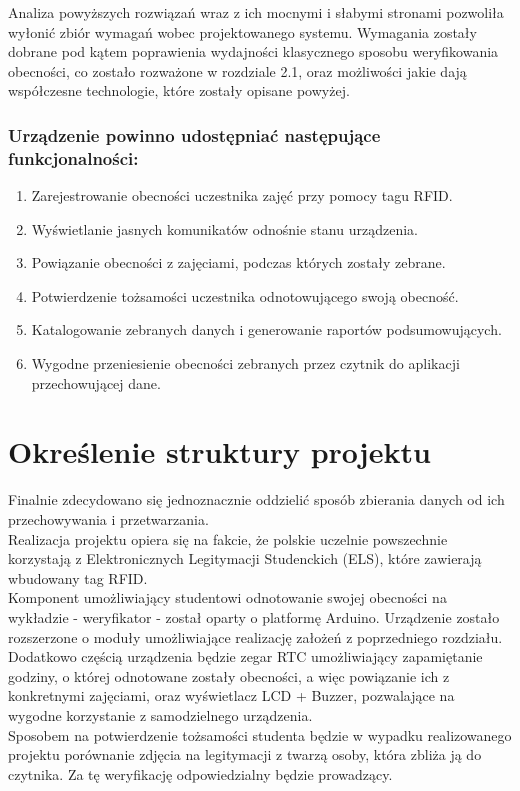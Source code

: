 \documentclass[declaration,shortabstract, mgr]{iithesis}
\begin{document}
\indent Analiza powyższych rozwiązań wraz z ich mocnymi i słabymi stronami pozwoliła wyłonić zbiór wymagań wobec projektowanego systemu. Wymagania zostały dobrane pod kątem poprawienia wydajności klasycznego sposobu weryfikowania obecności, co zostało rozważone w rozdziale 2.1, oraz możliwości jakie dają współczesne technologie, które zostały opisane powyżej.

\subsubsection{Urządzenie powinno udostępniać następujące funkcjonalności:}

\begin{enumerate}
\item Zarejestrowanie obecności uczestnika zajęć przy pomocy tagu RFID.
\item Wyświetlanie jasnych komunikatów odnośnie stanu urządzenia.
\item Powiązanie obecności z zajęciami, podczas których zostały zebrane.
\item Potwierdzenie tożsamości uczestnika odnotowującego swoją obecność.
\item Katalogowanie zebranych danych i generowanie raportów podsumowujących.
\item Wygodne przeniesienie obecności zebranych przez czytnik do aplikacji przechowującej dane.
\end{enumerate}



\section{Określenie struktury projektu}
\indent Finalnie zdecydowano się jednoznacznie oddzielić sposób zbierania danych od ich przechowywania i przetwarzania.\\
\indent Realizacja projektu opiera się na fakcie, że polskie uczelnie powszechnie korzystają z Elektronicznych Legitymacji Studenckich (ELS), które zawierają wbudowany tag RFID. \\
\indent Komponent umożliwiający studentowi odnotowanie swojej obecności na wykładzie - weryfikator - został oparty o platformę Arduino. Urządzenie zostało rozszerzone o moduły umożliwiające realizację założeń z poprzedniego rozdziału.\\
\indent Dodatkowo częścią urządzenia będzie zegar RTC umożliwiający zapamiętanie godziny, o której odnotowane zostały obecności, a więc powiązanie ich z konkretnymi zajęciami, oraz wyświetlacz LCD + Buzzer, pozwalające na wygodne korzystanie z samodzielnego urządzenia. \\
\indent Sposobem na potwierdzenie tożsamości studenta będzie w wypadku realizowanego projektu porównanie zdjęcia na legitymacji z twarzą osoby, która zbliża ją do czytnika. Za tę weryfikację odpowiedzialny będzie prowadzący.\\\\
\end{document}
